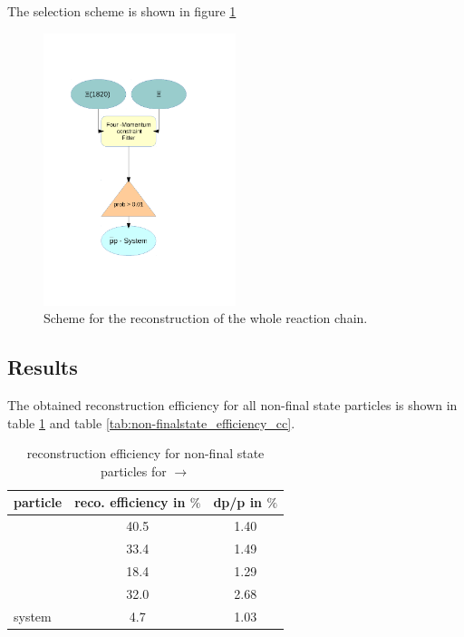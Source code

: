 	The selection scheme is shown in figure \ref{fig:fourconstraintfit}
	 
	\begin{figure}
		\centering
			\includegraphics[width=0.50\textwidth]{./plots/combineCascadeSys.pdf}
		\caption{\propose Scheme for the reconstruction of the whole reaction chain.}
		\label{fig:fourconstraintfit}
	\end{figure}
	
	\subsection*{Results}
	
	The obtained reconstruction efficiency for all non-final state particles is shown in table \ref{tab:non-finalstate_efficiency}
	and table \ref{tab:non-finalstate_efficiency_cc}.
	
	\begin{table}
		\centering
		\caption{\propose reconstruction efficiency for non-final state particles for \pbarpSystem $\rightarrow$ \excitedcascade \anticascade}
		\label{tab:non-finalstate_efficiency}
		
		\begin{tabular}{lcc}
		
			\hline
			particle & reco. efficiency in $\%$ & dp/p in $\%$ \\\hline
			\hline
			\lam & 40.5&   1.40 \\
			\alam & 33.4&   1.49\\
			\anticascade & 18.4&   1.29\\
			\excitedcascade & 32.0&   2.68 \\
			\excitedcascade \anticascade system & 4.7&   1.03\\\hline
			 	
		\end{tabular}
	\end{table}
	
